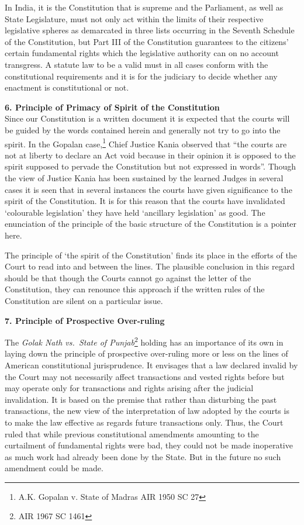 \begin{multicols}{2}
\noi
In India, it is the Constitution that is supreme and the Parliament, as well as State
Legislature, must not only act within the limits of their respective legislative spheres as
demarcated in three lists occurring in the Seventh Schedule of the Constitution, but Part
III of the Constitution guarantees to the citizens' certain fundamental rights which the
legislative authority can on no account transgress. A statute law to be a valid must in
all cases conform with the constitutional requirements and it is for the judiciary to
decide whether any enactment is constitutional or not.

\noi
{\bf 6. Principle of Primacy of Spirit of the Constitution}\\[0.2cm] Since our Constitution is a written document it is expected that the courts will be guided
by the words contained herein and generally not try to go into the spirit. In the Gopalan
case,\footnote{A.K. Gopalan v. State of Madras AIR 1950 SC 27} Chief Justice Kania observed that “the courts are not at liberty to declare an Act
void because in their opinion it is opposed to the spirit supposed to pervade the
Constitution but not expressed in words”. Though the view of Justice Kania has been
sustained by the learned Judges in several cases it is seen that in several instances the
courts have given significance to the spirit of the Constitution. It is for this reason that
the courts have invalidated ‘colourable legislation’ they have held ‘ancillary legislation’
as good. The enunciation of the principle of the basic structure of the Constitution is a
pointer here.

\noi
The principle of ‘the spirit of the Constitution’ finds its place in the efforts of the Court
to read into and between the lines. The plausible conclusion in this regard should be
that though the Courts cannot go against the letter of the Constitution, they can renounce
this approach if the written rules of the Constitution are silent on a particular issue.

\noi
{\bf 7. Principle of Prospective Over-ruling}\\[0.2cm] 

\vspace{-.6cm}

\noi
The \textit{Golak Nath vs.~State of Punjab}\footnote{ AIR 1967 SC 1461} holding has an importance of its own in laying
down the principle of prospective over-ruling more or less on the lines of American
constitutional jurisprudence. It envisages that a law declared invalid by the Court may not necessarily affect transactions and vested rights before but may operate only for
transactions and rights arising after the judicial invalidation. It is based on the premise
that rather than disturbing the past transactions, the new view of the interpretation of
law adopted by the courts is to make the law effective as regards future transactions
only. Thus, the Court ruled that while previous constitutional amendments amounting
to the curtailment of fundamental rights were bad, they could not be made inoperative
as much work had already been done by the State. But in the future no such amendment
could be made.


\end{multicols}
